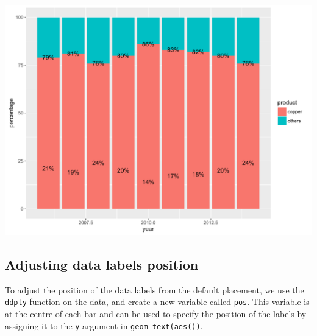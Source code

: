 \documentclass[]{article}
\newenvironment{Shaded}{\begin{snugshade}}{\end{snugshade}}
\newcommand{\KeywordTok}[1]{\textcolor[rgb]{0.13,0.29,0.53}{\textbf{{#1}}}}
\newcommand{\DataTypeTok}[1]{\textcolor[rgb]{0.13,0.29,0.53}{{#1}}}
\newcommand{\DecValTok}[1]{\textcolor[rgb]{0.00,0.00,0.81}{{#1}}}
\newcommand{\FloatTok}[1]{\textcolor[rgb]{0.00,0.00,0.81}{{#1}}}
\newcommand{\StringTok}[1]{\textcolor[rgb]{0.31,0.60,0.02}{{#1}}}
\newcommand{\NormalTok}[1]{{#1}}
\begin{document}
\begin{center}\includegraphics{0_all_posts_pdf/stacked_2-1} \end{center}

\subsection{Adjusting data labels
position}\label{adjusting-data-labels-position-1}

To adjust the position of the data labels from the default placement, we
use the \texttt{ddply} function on the data, and create a new variable
called \texttt{pos}. This variable is at the centre of each bar and can
be used to specify the position of the labels by assigning it to the
\texttt{y} argument in \texttt{geom\_text(aes())}.

\begin{Shaded}
\end{Shaded}
\end{document}
